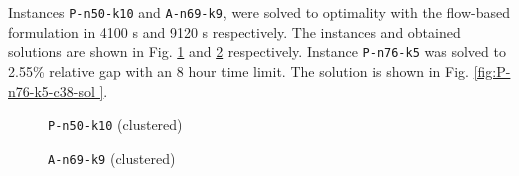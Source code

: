 \documentclass[letterpaper,12pt,onehalfspacing,twoside]{article}
\theoremstyle{msds}
\begin{document}
Instances \texttt{P-n50-k10} and \texttt{A-n69-k9}, were solved to optimality with the flow-based formulation in 4100 s and 9120 s respectively. The instances and obtained solutions are shown in Fig. \ref{fig:P-n50-k10-sol} and \ref{fig:A-n69-k9-sol} respectively. Instance \texttt{P-n76-k5} was solved to 2.55\% relative gap with an 8 hour time limit. The solution is shown in Fig. \ref{fig:P-n76-k5-c38-sol }.

\begin{figure}[htbp]
\centering
{}
\quad
{}
\caption{\texttt{P-n50-k10} (clustered)}
\label{fig:P-n50-k10-sol}
\end{figure}

\begin{figure}[htbp]
\centering
{}
\quad
{}
\caption{\texttt{A-n69-k9} (clustered)}
\label{fig:A-n69-k9-sol}
\end{figure}
\end{document}
